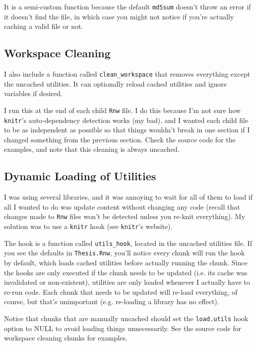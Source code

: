 It is a semi-custom function because the default \texttt{md5sum} doesn't throw an error if it doesn't find the file, in which case you might not notice if you're actually caching a valid file or not.

\subsection{Workspace Cleaning}

I also include a function called \texttt{clean\_workspace} that removes everything except the uncached utilities. It can optionally reload cached utilities and ignore variables if desired. 

I run this at the end of each child \texttt{Rnw} file. I do this because I'm not sure how \texttt{knitr}'s auto-dependency detection works (my bad), and I wanted each child file to be as independent as possible so that things wouldn't break in one section if I changed something from the previous section. Check the source code for the examples, and note that this cleaning is always uncached.

\subsection{Dynamic Loading of Utilities}

I was using several libraries, and it was annoying to wait for all of them to load if all I wanted to do was update content without changing any \R{} code (recall that changes made to \texttt{Rnw} files won't be detected unless you re-knit everything). My solution was to use a \texttt{knitr} hook (see \texttt{knitr}'s website).

The hook is a function called \texttt{utils\_hook}, located in the uncached utilities file. If you see the defaults in \texttt{Thesis.Rnw}, you'll notice every chunk will run the hook by default, which loads cached utilities before actually running the chunk. Since the hooks are only executed if the chunk needs to be updated (i.e. its cache was invalidated or non-existent), utilities are only loaded whenever I actually have to re-run \R{} code. Each chunk that needs to be updated will re-load everything, of course, but that's unimportant (e.g. re-loading a library has no effect).

Notice that chunks that are manually uncached should set the \texttt{load.utils} hook option to NULL to avoid loading things unnecessarily. See the source code for workspace cleaning chunks for examples.

